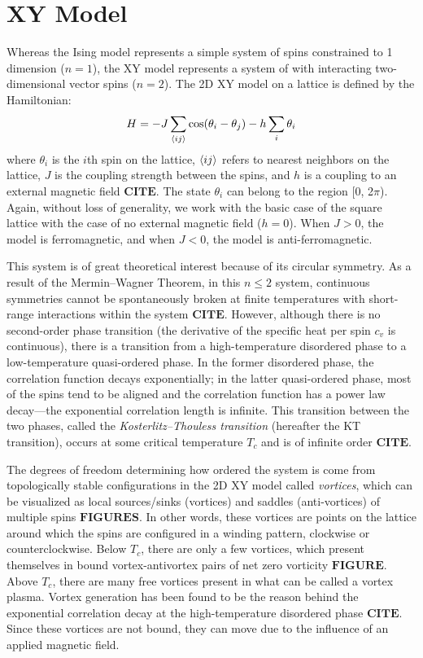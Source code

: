 \documentclass[twocolumn,aps,prl]{revtex4-1} %
\begin{document}
\section{XY Model}
Whereas the Ising model represents a simple system of spins constrained to 1 dimension ($n=1$), the XY model represents a system of with interacting two-dimensional vector spins ($n=2$). The 2D XY model on a lattice is defined by the Hamiltonian: 
\begin{equation}
H = -J\sum_{\braket{ij}} \cos(\theta_i - \theta_j) - h\sum_i \theta_i
\end{equation}
where $\theta_i$ is the $i$th spin on the lattice, $\braket{ij}$ refers to nearest neighbors on the lattice, $J$ is the coupling strength between the spins, and $h$ is a coupling to an external magnetic field $\textbf{CITE}$. The state $\theta_i$ can belong to the region [0, 2$\pi$). Again, without loss of generality, we work with the basic case of the square lattice with the case of no external magnetic field ($h=0$). When $J > 0$, the model is ferromagnetic, and when $J<0$, the model is anti-ferromagnetic. 

This system is of great theoretical interest because of its circular symmetry. As a result of the Mermin--Wagner Theorem, in this $n \leq 2$ system, continuous symmetries cannot be spontaneously broken at finite temperatures with short-range interactions within the system $\textbf{CITE}$. However, although there is no second-order phase transition (the derivative of the specific heat per spin $c_v$ is continuous), there is a transition from a high-temperature disordered phase to a low-temperature quasi-ordered phase. In the former disordered phase, the correlation function decays exponentially; in the latter quasi-ordered phase, most of the spins tend to be aligned and the correlation function has a power law decay---the exponential correlation length is infinite. This transition between the two phases, called the \textit{Kosterlitz--Thouless transition} (hereafter the KT transition), occurs at some critical temperature $T_c$ and is of infinite order $\textbf{CITE}$. 

The degrees of freedom determining how ordered the system is come from topologically stable configurations in the 2D XY model called \textit{vortices}, which can be visualized as local sources/sinks (vortices) and saddles (anti-vortices) of multiple spins $\textbf{FIGURES}$. In other words, these vortices are points on the lattice around which the spins are configured in a winding pattern, clockwise or counterclockwise. Below $T_c$, there are only a few vortices, which present themselves in bound vortex-antivortex pairs of net zero vorticity $\textbf{FIGURE}$. Above $T_c$, there are many free vortices present in what can be called a vortex plasma. Vortex generation has been found to be the reason behind the exponential correlation decay at the high-temperature disordered phase $\textbf{CITE}$. Since these vortices are not bound, they can move due to the influence of an applied magnetic field. 
\end{document}
